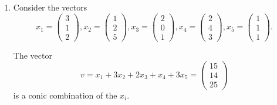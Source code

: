 \begin{enumerate}[1)]
$$ x_1 = \left(\begin{array}{c} 3 \\ 1 \\ 2\end{array}\right), x_2 = \left(\begin{array}{c} 1 \\ 2 \\ 5 \end{array}\right), x_3 = \left(\begin{array}{c} 2 \\ 0 \\ 1 \end{array}\right), x_4 = \left(\begin{array}{c}  2 \\ 4 \\ 3 \end{array}\right), x_5 = \left(\begin{array}{c}  1 \\ 1 \\ 1 \end{array}\right). $$

Let $A=\{x_1, \ldots, x_5\}$.
Find two disjoint subsets $A_1,~A_2\subseteq A$ such that 
$$ \conv(A_1)\cap\conv(A_2)\neq \emptyset.$$ 
\emph{Hint: Recall the proof of Radon's lemma}
\item Consider the vectors
$$ x_1 = \left(\begin{array}{c} 3 \\ 1 \\ 2\end{array}\right), x_2 = \left(\begin{array}{c} 1 \\ 2 \\ 5 \end{array}\right), x_3 = \left(\begin{array}{c} 2 \\ 0 \\ 1 \end{array}\right), x_4 = \left(\begin{array}{c}  2 \\ 4 \\ 3 \end{array}\right), x_5 = \left(\begin{array}{c}  1 \\ 1 \\ 1 \end{array}\right). $$

The vector 
$$ v= x_1 + 3 x_2 + 2 x_3 + x_4 + 3 x_5 =  \left(\begin{array}{c}  15\\ 14 \\ 25 \end{array}\right)$$
is a conic combination of the $x_i$.


\end{enumerate}
